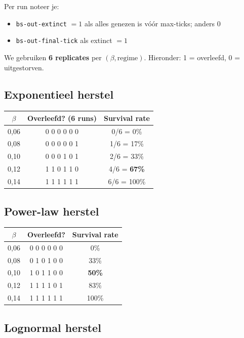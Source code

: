 \documentclass[11pt,a4paper]{article}
\begin{document}
Per run noteer je:
\begin{itemize}[nosep]
  \item \texttt{bs-out-extinct} $= 1$ als alles genezen is v\'o\'or max-ticks; anders $0$
  \item \texttt{bs-out-final-tick} als extinct $= 1$
\end{itemize}

We gebruiken \textbf{6 replicates} per $(\beta, \text{regime})$. Hieronder: 1 = overleefd, 0 = uitgestorven.

\subsection*{Exponentieel herstel}

\begin{center}
\begin{tabular}{@{}ccc@{}}
\toprule
$\beta$ & Overleefd? (6 runs) & Survival rate \\
\midrule
0,06 & 0 0 0 0 0 0 & 0/6 = 0\% \\
0,08 & 0 0 0 0 0 1 & 1/6 = 17\% \\
0,10 & 0 0 0 1 0 1 & 2/6 = 33\% \\
0,12 & 1 1 0 1 1 0 & 4/6 = \textbf{67\%} \\
0,14 & 1 1 1 1 1 1 & 6/6 = 100\% \\
\bottomrule
\end{tabular}
\end{center}

\subsection*{Power-law herstel}

\begin{center}
\begin{tabular}{@{}ccc@{}}
\toprule
$\beta$ & Overleefd? & Survival rate \\
\midrule
0,06 & 0 0 0 0 0 0 & 0\% \\
0,08 & 0 1 0 1 0 0 & 33\% \\
0,10 & 1 0 1 1 0 0 & \textbf{50\%} \\
0,12 & 1 1 1 1 0 1 & 83\% \\
0,14 & 1 1 1 1 1 1 & 100\% \\
\bottomrule
\end{tabular}
\end{center}

\subsection*{Lognormal herstel}
\end{document}
